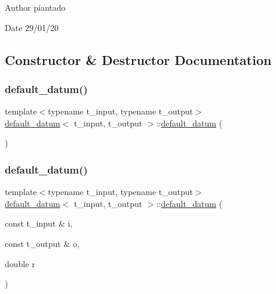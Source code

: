 \begin{DoxyAuthor}{Author}
piantado 
\end{DoxyAuthor}
\begin{DoxyDate}{Date}
29/01/20 
\end{DoxyDate}


\subsection{Constructor \& Destructor Documentation}
\mbox{\label{classdefault__datum_a7153b5621e08e438753c4a90271c2eee}} 
\subsubsection{\texorpdfstring{default\+\_\+datum()}{default\_datum()}\hspace{0.1cm}{\footnotesize\ttfamily [1/3]}}
{\footnotesize\ttfamily template$<$typename t\+\_\+input, typename t\+\_\+output$>$ \\
\hyperlink{classdefault__datum}{default\+\_\+datum}$<$ t\+\_\+input, t\+\_\+output $>$\+::\hyperlink{classdefault__datum}{default\+\_\+datum} (\begin{DoxyParamCaption}{ }\end{DoxyParamCaption})\hspace{0.3cm}{\ttfamily [inline]}}

\mbox{\label{classdefault__datum_aaaa9c76cb8d02eab61cc6f0c3570a64d}} 
\subsubsection{\texorpdfstring{default\+\_\+datum()}{default\_datum()}\hspace{0.1cm}{\footnotesize\ttfamily [2/3]}}
{\footnotesize\ttfamily template$<$typename t\+\_\+input, typename t\+\_\+output$>$ \\
\hyperlink{classdefault__datum}{default\+\_\+datum}$<$ t\+\_\+input, t\+\_\+output $>$\+::\hyperlink{classdefault__datum}{default\+\_\+datum} (\begin{DoxyParamCaption}\item[{const t\+\_\+input \&}]{i,  }\item[{const t\+\_\+output \&}]{o,  }\item[{double}]{r }\end{DoxyParamCaption})\hspace{0.3cm}{\ttfamily [inline]}}

